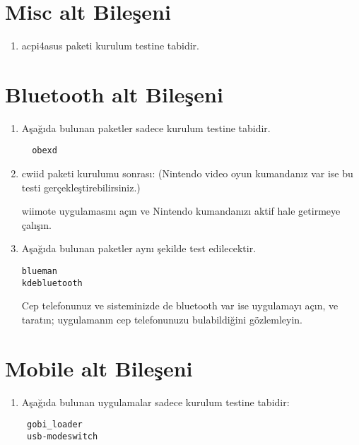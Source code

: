 \documentclass[a4paper,10pt]{article}
\begin{document}
\section{Misc alt Bileşeni}
\begin{enumerate}
 \item acpi4asus paketi kurulum testine tabidir. 

\end{enumerate}

\section{Bluetooth alt Bileşeni}
\begin{enumerate}

 \item Aşağıda bulunan paketler sadece kurulum testine tabidir. 
\begin{verbatim}
  obexd
\end{verbatim}

 \item cwiid paketi kurulumu sonrası: (Nintendo video oyun kumandanız var ise bu testi gerçekleştirebilirsiniz.)

wiimote uygulamasını açın ve Nintendo kumandanızı aktif hale getirmeye çalışın.

\item Aşağıda bulunan paketler aynı şekilde test edilecektir.
\begin{verbatim}
blueman
kdebluetooth 
\end{verbatim}

Cep telefonunuz ve sisteminizde de bluetooth var ise uygulamayı açın, ve taratın; uygulamanın cep telefonunuzu bulabildiğini gözlemleyin.
\end{enumerate}

\section{Mobile alt Bileşeni}
\begin{enumerate}
 \item Aşağıda bulunan uygulamalar sadece kurulum testine tabidir:
\begin{verbatim}
 gobi_loader
 usb-modeswitch
\end{verbatim}

\end{enumerate}
\end{document}

